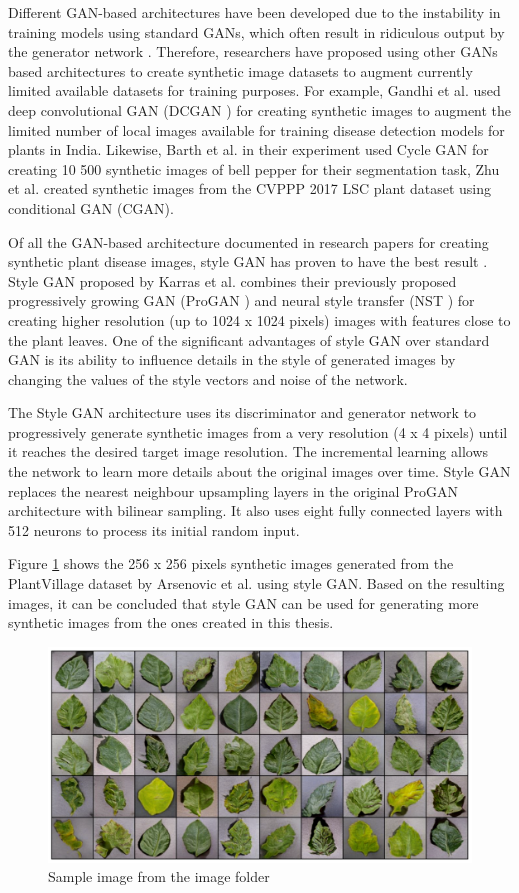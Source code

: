 Different GAN-based architectures have been developed due to the instability in training models using standard GANs, which often result in ridiculous output by the generator network \cite{radford2015unsupervised}. Therefore, researchers have proposed using other GANs based architectures to create synthetic image datasets to augment currently limited available datasets for training purposes. For example,  Gandhi et al. \cite{gandhi2018plant} used deep convolutional GAN (DCGAN \cite{radford2015unsupervised}) for creating synthetic images to augment the limited number of local images available for training disease detection models for plants in India. Likewise, Barth et al. \cite{barth2020optimising} in their experiment used Cycle GAN for creating 10 500 synthetic images of bell pepper for their segmentation task, Zhu et al. \cite{zhu2018data} created synthetic images from the CVPPP 2017 LSC plant dataset using conditional GAN (CGAN).

Of all the GAN-based architecture documented in research papers for creating synthetic plant disease images, style GAN has proven to have the best result \cite{arsenovic2019solving}. Style GAN proposed by Karras et al. \cite{karras2019style} combines their previously proposed progressively growing GAN (ProGAN \cite{karras2017progressive}) and neural style transfer (NST \cite{gatys2015neural}) for creating higher resolution (up to 1024 x 1024 pixels) images with features close to the plant leaves. One of the significant advantages of style GAN over standard GAN is its ability to influence details in the style of generated images by changing the values of the style vectors and noise of the network.


The Style GAN architecture uses its discriminator and generator network to progressively generate synthetic images from a very resolution (4 x 4 pixels) until it reaches the desired target image resolution. The incremental learning allows the network to learn more details about the original images over time. Style GAN replaces the nearest neighbour upsampling layers in the original ProGAN architecture with bilinear sampling. It also uses eight fully connected layers with 512 neurons to process its initial random input.

Figure \ref{fig:my_style_gan} shows the 256 x 256 pixels synthetic images generated from the PlantVillage dataset by Arsenovic et al. \cite{arsenovic2019solving} using style GAN. Based on the resulting images, it can be concluded that style GAN can be used for generating more synthetic images from the ones created in this thesis.

\begin{figure}[!htb]
    \centering
    \includegraphics[scale=2, keepaspectratio]{Figures/styleGAN.png}
    \caption{Sample image from the image folder}
    \label{fig:my_style_gan}
\end{figure} 